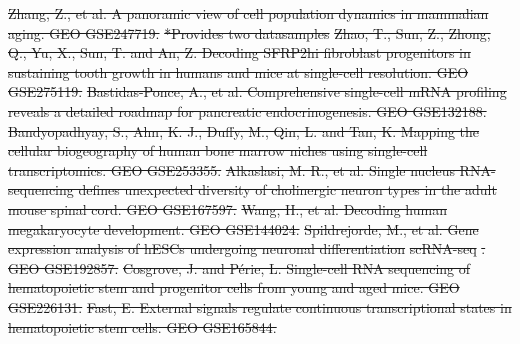 \documentclass[referee, pdflatex, sn-vancouver-num]{sn-jnl}
\providecommand{\DIFdeltex}[1]{{\protect\color{red}\sout{#1}}}                      %
\providecommand{\DIFdel}[1]{\texorpdfstring{\DIFdeltex{#1}}{}} %
\begin{document}
\begin{appendices}
\DIFdel{Zhang, Z., et al. A panoramic view of cell population dynamics in mammalian aging. GEO GSE247719. }%
\DIFdel{*Provides two datasamples
	}%
\DIFdel{Zhao, T., Sun, Z., Zhong, Q., Yu, X., Sun, T. and An, Z. Decoding SFRP2hi fibroblast progenitors in sustaining tooth growth in humans and mice at single-cell resolution. GEO GSE275119. }%
\DIFdel{Bastidas-Ponce, A., et al. Comprehensive single-cell mRNA profiling reveals a detailed roadmap for pancreatic endocrinogenesis. GEO GSE132188. }%
\DIFdel{Bandyopadhyay, S., Ahn, K. J., Duffy, M., Qin, L. and Tan, K. Mapping the cellular biogeography of human bone marrow niches using single-cell transcriptomics. GEO GSE253355. }%
\DIFdel{Alkaslasi, M. R., et al. Single nucleus RNA-sequencing defines unexpected diversity of cholinergic neuron types in the adult mouse spinal cord. GEO GSE167597. }%
\DIFdel{Wang, H., et al. Decoding human megakaryocyte development. GEO GSE144024. }%
\DIFdel{Spildrejorde, M., et al. Gene expression analysis of hESCs undergoing neuronal differentiation }%
\DIFdel{scRNA-seq}%
\DIFdel{. GEO GSE192857. }%
\DIFdel{Cosgrove, J. and P\'{e}rie, L. Single-cell RNA sequencing of hematopoietic stem and progenitor cells from young and aged mice. GEO GSE226131. }%
\DIFdel{Fast, E. External signals regulate continuous transcriptional states in hematopoietic stem cells. GEO GSE165844. }%

\end{appendices}
\end{document}

